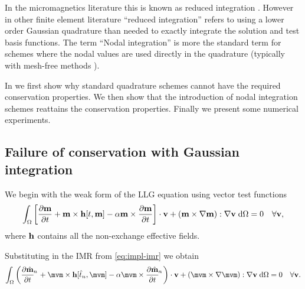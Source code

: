 In the micromagnetics literature this is known as reduced integration \cite{Cimrak2008}.
However in other finite element literature ``reduced integration'' refers to using a lower order Gaussian quadrature than needed to exactly integrate the solution and test basis functions.
The term ``Nodal integration'' is more the standard term for schemes where the nodal values are used directly in the quadrature (typically with mesh-free methods \eg \cite{Puso2008}).

In  we first show why standard quadrature schemes cannot have the required conservation properties.
We then show that the introduction of nodal integration schemes reattains the conservation properties.
Finally we present some numerical experiments.


\subsection{Failure of conservation with Gaussian integration}

\newcommand{\midpoint}[1]{\hat{#1}}
\newsubcommand{\mvm}{\midpoint{\mv}}{n}
\newcommand{\tm}{\midpoint{t}_n}
\newcommand{\dtop}{\delta}
\newcommand{\pdsub}[3]{\mathrlap{\pd{#1\mathrlap{_{#2}}}{#3}}\phantom{\pd{#1_{#2}}{#3}}}
\newcommand{\dmdtm}{\pdsub{\midpoint{\mv}}{n}{t}}
\newcommand{\dmdtml}{\pdsub{\midpoint{\mv}}{n,l}{t}}
\newcommand{\dmdtmj}{\pdsub{\midpoint{\mv}}{n,j}{t}}

\newcommand{\ipg}[2]{\intd{{#1} \cdot {#2}}}

We begin with the weak form of the LLG equation using vector test functions
\begin{equation}
  \label{eq:weak-llg}
  {\int_{\Omega} { {\left[ \frac{\partial \mathbf{m}}{\partial t}+ \mathbf{m}\times \mathbf{h}[t, \mathbf{m}] - \alpha\mathbf{m}\times \frac{\partial \mathbf{m}}{\partial t}\right]} \cdot \mathbf{v}+ {\left( \mathbf{m}\times \nabla\mathbf{m}\right)} : \nabla\mathbf{v}} {\; \mathrm{{d}}}{\Omega}} = 0 \quad \forall \mathbf{v},
\end{equation}
where $\mathbf{h}$ contains all the non-exchange effective fields.


Substituting in the IMR from \cref{eq:impl-imr} we obtain
\begin{equation}
  \label{eq:weak-llg-imr}
  \intd{\bigb{\dmdtm + \mvm \times \hv[\tm, \mvm] - \dampc \mvm \times \dmdtm} \cdot \testv
  + \bigb{\mvm \times \grad \mvm} : \grad \testv} = 0 \quad \forall \testv.
\end{equation}

